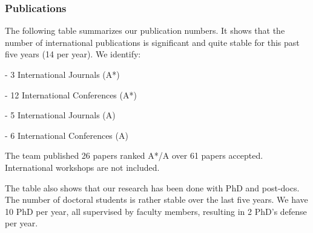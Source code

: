 \subsubsection{Publications} %

The following table summarizes our publication numbers. It  shows that the number of international publications is significant and quite stable for this past five years (14 per year). We identify: 

- 3 International Journals (A*)

- 12  International Conferences (A*)

- 5 International Journals (A) 

- 6 International Conferences (A)

The team published  26 papers ranked A*/A over 61 papers accepted. International workshops are not included.

The table also shows that our research has been done with PhD and post-docs. The  number of doctoral students is rather stable over the last five years. We have 10 PhD per year, all supervised by faculty members, resulting in 2 PhD's defense per year. 




